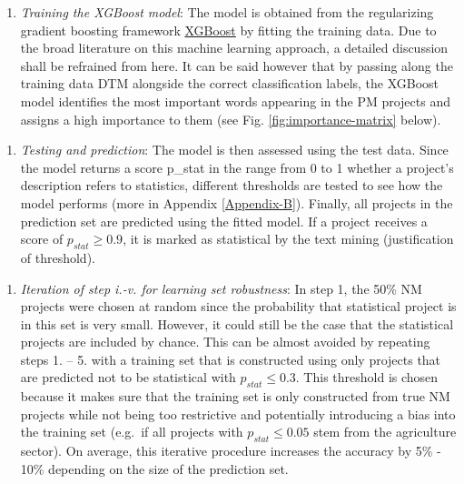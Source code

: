 \documentclass[
]{article}
\providecommand{\tightlist}{%
  \setlength{\itemsep}{0pt}\setlength{\parskip}{0pt}}
\begin{document}
\begin{enumerate}
  \begin{enumerate}
  \def\labelenumii{\roman{enumii}.}
  \setcounter{enumii}{3}
  \tightlist
  \item
    \emph{Training the XGBoost model}: The model is obtained from the regularizing gradient boosting framework \href{https://xgboost.readthedocs.io/en/stable/index.html}{XGBoost} by fitting the training data. Due to the broad literature on this machine learning approach, a detailed discussion shall be refrained from here. It can be said however that by passing along the training data DTM alongside the correct classification labels, the XGBoost model identifies the most important words appearing in the PM projects and assigns a high importance to them (see Fig. \ref{fig:importance-matrix} below).
  \end{enumerate}

  \begin{enumerate}
  \def\labelenumii{\alph{enumii}.}
  \setcounter{enumii}{21}
  \tightlist
  \item
    \emph{Testing and prediction}: The model is then assessed using the test data. Since the model returns a score p\_stat in the range from 0 to 1 whether a project's description refers to statistics, different thresholds are tested to see how the model performs (more in Appendix \ref{Appendix-B}). Finally, all projects in the prediction set are predicted using the fitted model. If a project receives a score of \(p_{stat} \geq 0.9\), it is marked as statistical by the text mining (justification of threshold).
  \end{enumerate}

  \begin{enumerate}
  \def\labelenumii{\roman{enumii}.}
  \setcounter{enumii}{5}
  \tightlist
  \item
    \emph{Iteration of step i.-v. for learning set robustness}: In step 1, the 50\% NM projects were chosen at random since the probability that statistical project is in this set is very small. However, it could still be the case that the statistical projects are included by chance. This can be almost avoided by repeating steps 1. -- 5. with a training set that is constructed using only projects that are predicted not to be statistical with \(p_{stat} \leq 0.3\). This threshold is chosen because it makes sure that the training set is only constructed from true NM projects while not being too restrictive and potentially introducing a bias into the training set (e.g.~if all projects with \(p_{stat} \leq 0.05\) stem from the agriculture sector). On average, this iterative procedure increases the accuracy by 5\% - 10\% depending on the size of the prediction set.
  \end{enumerate}
\end{enumerate}
\end{document}
